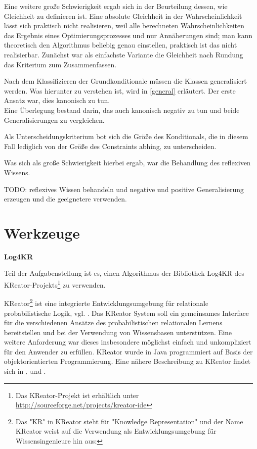 \documentclass[a4paper, 11pt]{book}
\begin{document}
Eine weitere große Schwierigkeit ergab sich in der Beurteilung dessen, wie Gleichheit zu definieren ist. Eine absolute Gleichheit in der Wahrscheinlichkeit lässt sich praktisch nicht realisieren, weil alle berechneten Wahrscheinlichkeiten das Ergebnis eines Optimierungsprozesses und nur Annäherungen sind; man kann theoretisch den Algorithmus beliebig genau einstellen, praktisch ist das nicht realisierbar. Zunächst war als einfachste Variante die Gleichheit nach Rundung das Kriterium zum Zusammenfassen.

Nach dem Klassifizieren der Grundkonditionale müssen die Klassen generalisiert werden. Was hierunter zu verstehen ist, wird in \ref{general} erläutert. 
Der erste Ansatz war, dies kanonisch zu tun.\\
Eine Überlegung bestand darin, das auch kanonisch negativ zu tun und beide Generalisierungen zu vergleichen.

Als Unterscheidungskriterium bot sich die Größe des Konditionals, die in diesem Fall lediglich von der Größe des Constraints abhing, zu unterscheiden.

Was sich als große Schwierigkeit hierbei ergab, war die Behandlung des reflexiven Wissens.

TODO:
reflexives Wissen behandeln und negative und positive Generalisierung erzeugen und die geeignetere verwenden.




\section{Werkzeuge}

\textbf{Log4KR}

Teil der Aufgabenstellung ist es, einen Algorithmus der Bibliothek Log4KR des KReator-Projekts\footnote{Das KReator-Projekt ist erhältlich unter \href{http://sourceforge.net/projects/kreator-ide}{http://sourceforge.net/projects/kreator-ide}} zu verwenden.

KReator\footnote{Das "{}KR"{} in KReator steht für "{}Knowledge Representation"{} und der Name KReator weist auf die Verwendung als Entwicklungsumgebung für Wissensingenieure hin aus:\cite{FLT09}} ist eine integrierte Entwicklungsumgebung für relationale probabilistische Logik, vgl. \cite{BHM14}. Das KReator System soll ein gemeinsames Interface für die verschiedenen Ansätze des probabilistischen relationalen Lernens bereitstellen und bei der Verwendung von Wissensbasen unterstützen. Eine weitere Anforderung war dieses insbesondere möglichst einfach und unkompliziert für den Anwender zu erfüllen. KReator wurde in Java programmiert auf Basis der objektorientierten Programmierung. Eine nähere Beschreibung zu KReator findet sich in \cite{TFLKIB10}, \cite{KIBFT11} und \cite{FLT09}.
\end{document}
